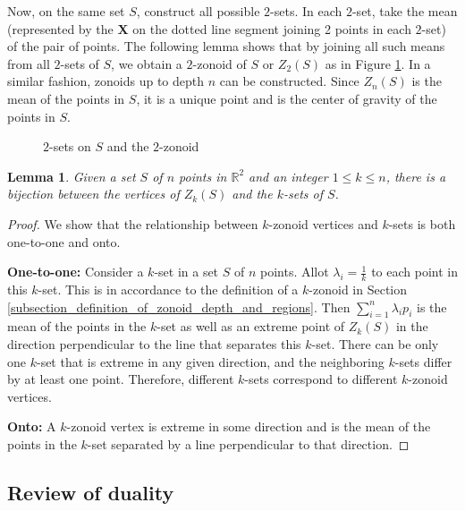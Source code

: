 \documentclass[charterfonts,lotsofwhite]{patmorin}
\newtheorem{lemma}{Lemma}
\begin{document}
Now, on the same set $S$, construct all possible $2$-sets. In each $2$-set, take the mean (represented by the \textbf{X} on the dotted line segment joining 2 points in each $2$-set) of the pair of points. The following lemma shows that by joining all such means from all $2$-sets of $S$, we obtain a $2$-zonoid of $S$ or $Z_2(S)$ as in Figure \ref{fig_2_set}. In a similar fashion, zonoids up to depth $n$ can be constructed. Since $Z_n(S)$ is the mean of the points in $S$, it is a unique point and is the center of gravity of the points in $S$.

\begin{figure}[ht]
 \begin{center}
   \caption{\label{fig_2_set}$2$-sets on $S$ and the $2$-zonoid}
 \end{center}
\end{figure}

\begin{lemma}\label{lemma_bijection}
Given a set $S$ of $n$ points in $\mathbb{R}^2$ and an integer $1 \le k \le n$, there is a bijection between the vertices of $Z_k(S)$ and the $k$-sets of $S$.
\end{lemma}

\begin{proof}
We show that the relationship between $k$-zonoid vertices and $k$-sets is both one-to-one and onto.

\textbf{One-to-one:} Consider a $k$-set in a set $S$ of $n$ points. Allot $\lambda_i = \frac{1}{k}$ to each point in this $k$-set. This is in accordance to the definition of a $k$-zonoid in Section \ref{subsection_definition_of_zonoid_depth_and_regions}. Then $\sum_{i=1}^{n}\lambda_ip_i$ is the mean of the points in the $k$-set as well as an extreme point of $Z_k(S)$ in the direction perpendicular to the line that separates this $k$-set. There can be only one $k$-set that is extreme in any given direction, and the neighboring $k$-sets differ by at least one point. Therefore, different $k$-sets correspond to different $k$-zonoid vertices.

\textbf{Onto:} A $k$-zonoid vertex is extreme in some direction and is the mean of the points in the $k$-set separated by a line perpendicular to that direction. 
\end{proof}

\subsection{Review of duality}\label{subsection_review_of_duality}
\end{document}
